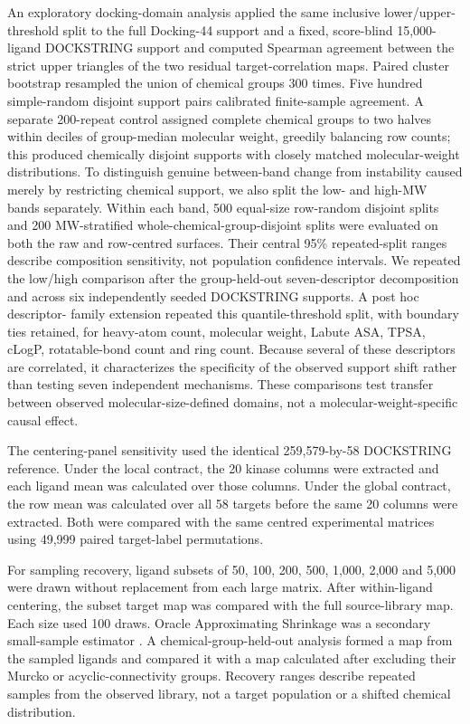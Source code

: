 \documentclass[11pt]{article}
\begin{document}
An exploratory docking-domain analysis applied the same inclusive lower/upper-threshold split to the
full Docking-44 support and a fixed, score-blind 15,000-ligand DOCKSTRING support and
computed Spearman agreement between the strict upper triangles of the two residual
target-correlation maps. Paired cluster bootstrap resampled the union of
chemical groups 300 times. Five hundred simple-random disjoint support pairs calibrated
finite-sample agreement. A separate 200-repeat control assigned complete chemical groups to
two halves within deciles of group-median molecular weight, greedily balancing row counts;
this produced chemically disjoint supports with closely matched molecular-weight
distributions. To distinguish genuine between-band change from instability caused merely by
restricting chemical support, we also split the low- and high-MW bands separately. Within
each band, 500 equal-size row-random disjoint splits and 200 MW-stratified
whole-chemical-group-disjoint splits were evaluated on both the raw and row-centred
surfaces. Their central 95\% repeated-split ranges describe composition sensitivity, not
population confidence intervals. We repeated the low/high comparison after the group-held-out seven-descriptor
decomposition and across six independently seeded DOCKSTRING supports. A post hoc descriptor-
family extension repeated this quantile-threshold split, with boundary ties retained, for heavy-atom count, molecular weight,
Labute ASA, TPSA, cLogP, rotatable-bond count and ring count. Because several of these
descriptors are correlated, it characterizes the specificity of the observed support shift
rather than testing seven independent mechanisms. These comparisons test transfer between
observed molecular-size-defined domains, not a molecular-weight-specific causal effect.

The centering-panel sensitivity used the identical 259,579-by-58 DOCKSTRING reference.
Under the local contract, the 20 kinase columns were extracted and each ligand mean was
calculated over those columns. Under the global contract, the row mean was calculated over
all 58 targets before the same 20 columns were extracted. Both were compared with the same
centred experimental matrices using 49,999 paired target-label permutations.

For sampling recovery, ligand subsets of 50, 100, 200, 500, 1,000, 2,000 and 5,000 were
drawn without replacement from each large matrix. After within-ligand centering, the subset
target map was compared with the full source-library map. Each size used 100 draws. Oracle
Approximating Shrinkage was a secondary small-sample estimator \cite{chen2010}. A chemical-group-held-out analysis formed a map from the sampled ligands and
compared it with a map calculated after excluding their Murcko or acyclic-connectivity
groups. Recovery ranges describe repeated samples from the observed library, not a target
population or a shifted chemical distribution.
\end{document}
